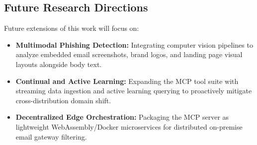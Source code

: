 \documentclass[conference]{IEEEtran}
\begin{document}
\subsection{Future Research Directions}
Future extensions of this work will focus on:
\begin{itemize}
    \item \textbf{Multimodal Phishing Detection:} Integrating computer vision pipelines to analyze embedded email screenshots, brand logos, and landing page visual layouts alongside body text.
    \item \textbf{Continual and Active Learning:} Expanding the MCP tool suite with streaming data ingestion and active learning querying to proactively mitigate cross-distribution domain shift.
    \item \textbf{Decentralized Edge Orchestration:} Packaging the MCP server as lightweight WebAssembly/Docker microservices for distributed on-premise email gateway filtering.
\end{itemize}

\FloatBarrier



\end{document}
